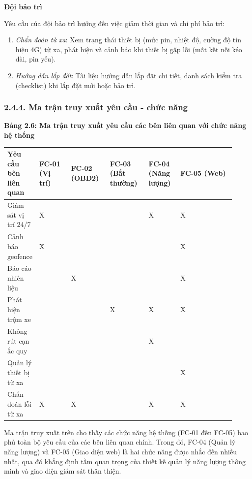 \documentclass[13pt,a4paper]{extarticle}
\newcounter{none} %
\newcommand{\thesislongtableorignewline}{}
\let\thesislongtableorignewline\\
\renewcommand{\\}{\thesislongtableorignewline\hline}%
\let\\\thesislongtableorignewline
\newcommand{\thesistabletitle}[1]{%
  \begin{center}\textbf{#1}\end{center}%
}
\providecommand{\tightlist}{%
  \setlength{\itemsep}{0pt}\setlength{\parskip}{0pt}}
\begin{document}
\textbf{Đội bảo trì}

Yêu cầu của đội bảo trì hướng đến việc giảm thời gian và chi phí bảo
trì:

\begin{enumerate}
\def\labelenumi{\arabic{enumi}.}
\tightlist
\item
  \emph{Chẩn đoán từ xa}: Xem trạng thái thiết bị (mức pin, nhiệt độ,
  cường độ tín hiệu 4G) từ xa, phát hiện và cảnh báo khi thiết bị gặp
  lỗi (mất kết nối kéo dài, pin yếu).
\item
  \emph{Hướng dẫn lắp đặt}: Tài liệu hướng dẫn lắp đặt chi tiết, danh
  sách kiểm tra (checklist) khi lắp đặt mới hoặc bảo trì.
\end{enumerate}

\subsubsection{2.4.4. Ma trận truy xuất yêu cầu - chức
năng}\label{244-ma-trux1eadn-truy-xuux1ea5t-yuxeau-cux1ea7u---chux1ee9c-nux103ng}

\thesistabletitle{Bảng 2.6: Ma trận truy xuất yêu cầu các bên liên quan với chức năng
hệ thống}

{\def\LTcaptype{none} %
\begin{longtable}{|p{0.06\linewidth}|p{0.14\linewidth}|p{0.17\linewidth}|p{0.17\linewidth}|p{0.14\linewidth}|p{0.24\linewidth}|}
\hline \textbf{Yêu cầu bên liên quan} & \textbf{FC-01 (Vị trí)} & \textbf{FC-02 (OBD2)} & \textbf{FC-03 (Bất
thường)} & \textbf{FC-04 (Năng lượng)} & \textbf{FC-05 (Web)} \\
\hline
\endhead
\hline
\endlastfoot
Giám sát vị trí 24/7 & X & & & X & X \\
Cảnh báo geofence & X & & & & X \\
Báo cáo nhiên liệu & & X & & & X \\
Phát hiện trộm xe & & & X & X & X \\
Không rút cạn ắc quy & & & & X & \\
Quản lý thiết bị từ xa & & & & & X \\
Chẩn đoán lỗi từ xa & X & X & & X & X \\
\end{longtable}
}

Ma trận truy xuất trên cho thấy các chức năng hệ thống (FC-01 đến FC-05)
bao phủ toàn bộ yêu cầu của các bên liên quan chính. Trong đó, FC-04
(Quản lý năng lượng) và FC-05 (Giao diện web) là hai chức năng được nhắc
đến nhiều nhất, qua đó khẳng định tầm quan trọng của thiết kế quản lý
năng lượng thông minh và giao diện giám sát thân thiện.
\end{document}
